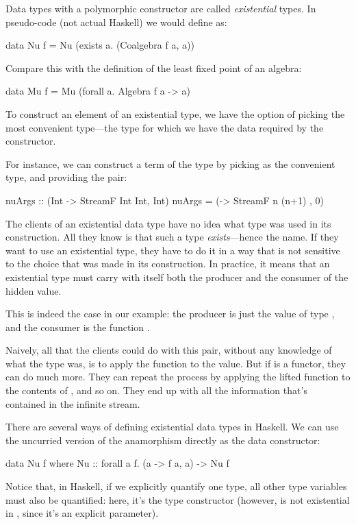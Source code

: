 \documentclass[DaoFP]{subfiles}
\begin{document}
Data types with a polymorphic constructor are called \emph{existential} types. In pseudo-code (not actual Haskell) we would define  as:
\begin{haskell}
data Nu f = Nu (exists a. (Coalgebra f a, a))
\end{haskell}
Compare this with the definition of the least fixed point of an algebra:
\begin{haskell}
data Mu f = Mu (forall a. Algebra f a -> a)
\end{haskell}


To construct an element of an existential type, we have the option of picking the most convenient type---the type for which we have the data required by the constructor. 

For instance, we can construct a term of the type  by picking  as the convenient type, and providing the pair:
\begin{haskell}
nuArgs :: (Int -> StreamF Int Int, Int)
nuArgs =  (\n -> StreamF n (n+1) , 0)
\end{haskell}

The clients of an existential data type have no idea what type was used in its construction. All they know is that such a type \emph{exists}---hence the name. If they want to use an existential type, they have to do it in a way that is not sensitive to the choice that was made in its construction. In practice, it means that an existential type must carry with itself both the producer and the consumer of the hidden value. 

This is indeed the case in our example: the producer is just the value of type , and the consumer is the function .

Naively, all that the clients could do with this pair, without any knowledge of what the type  was, is to apply the function to the value. But if  is a functor, they can do much more. They can repeat the process by applying the lifted function to the contents of , and so on. They end up with all the information that's contained in the infinite stream.

There are several ways of defining existential data types in Haskell. We can use the uncurried version of the anamorphism directly as the data constructor:
\begin{haskell}
data Nu f where 
  Nu :: forall a f. (a -> f a, a) -> Nu f
\end{haskell}
Notice that, in Haskell, if we explicitly quantify one type, all other type variables must also be quantified: here, it's the type constructor  (however,  is not existential in , since it's an explicit parameter). 
\end{document}
